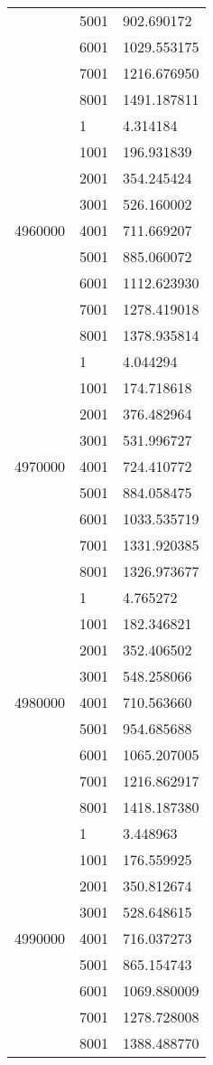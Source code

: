 \begin{table}[htb!]
\begin{tabular}{lll}
 & 5001 & 902.690172 \\
 & 6001 & 1029.553175 \\
 & 7001 & 1216.676950 \\
 & 8001 & 1491.187811 \\
\multirow[c]{9}{*}{4960000} & 1 & 4.314184 \\
 & 1001 & 196.931839 \\
 & 2001 & 354.245424 \\
 & 3001 & 526.160002 \\
 & 4001 & 711.669207 \\
 & 5001 & 885.060072 \\
 & 6001 & 1112.623930 \\
 & 7001 & 1278.419018 \\
 & 8001 & 1378.935814 \\
\multirow[c]{9}{*}{4970000} & 1 & 4.044294 \\
 & 1001 & 174.718618 \\
 & 2001 & 376.482964 \\
 & 3001 & 531.996727 \\
 & 4001 & 724.410772 \\
 & 5001 & 884.058475 \\
 & 6001 & 1033.535719 \\
 & 7001 & 1331.920385 \\
 & 8001 & 1326.973677 \\
\multirow[c]{9}{*}{4980000} & 1 & 4.765272 \\
 & 1001 & 182.346821 \\
 & 2001 & 352.406502 \\
 & 3001 & 548.258066 \\
 & 4001 & 710.563660 \\
 & 5001 & 954.685688 \\
 & 6001 & 1065.207005 \\
 & 7001 & 1216.862917 \\
 & 8001 & 1418.187380 \\
\multirow[c]{9}{*}{4990000} & 1 & 3.448963 \\
 & 1001 & 176.559925 \\
 & 2001 & 350.812674 \\
 & 3001 & 528.648615 \\
 & 4001 & 716.037273 \\
 & 5001 & 865.154743 \\
 & 6001 & 1069.880009 \\
 & 7001 & 1278.728008 \\
 & 8001 & 1388.488770 \\

\end{tabular}
\end{table}
